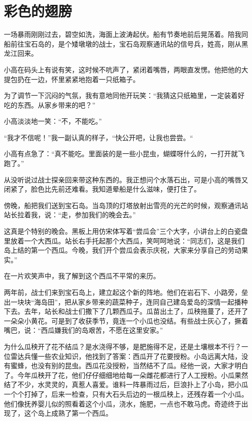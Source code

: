 \documentclass[12pt,UTF-8,openany]{ctexbook}
\begin{document}
\chapter{彩色的翅膀}

\begin{Large}
    
    一场暴雨刚刚过去，碧空如洗，海面上波涛起伏。船有节奏地前后晃荡着。陪我同船前往宝石岛的，是个矮墩墩的战士，宝石岛观察通讯站的信号兵，姓高，刚从黑龙江回来。
    
    小高在码头上有说有笑，这时候不吭声了，紧闭着嘴唇，两眼直发愣。他把他的大提包扔在一边，怀里紧紧地抱着一只纸箱子。
    
    为了调节一下沉闷的气氛，我有意地同他开玩笑：“我猜这只纸箱里，一定装着好吃的东西。从家乡带来的吧？”
    
    小高淡淡地一笑：“不，不能吃。”
    
    “我才不信呢！”我一副认真的样子，“快公开吧，让我也尝尝。“
    
    小高有点急了：“真不能吃。里面装的是一些小昆虫，蝴蝶呀什么的，一打开就飞跑了。”
    
    从没听说过战士探亲回来带这种东西的。我正想问个水落石出，可是小高的嘴唇又闭紧了，脸色比先前还难看。我知道晕船是什么滋味，便打住了。
    
    傍晚，船把我们送到宝石岛。当岛顶的灯塔放射出雪亮的光芒的时候，观察通讯站站长拉着我，说：“走，参加我们的晚会去。”
    
    这真是个特别的晚会。黑板上用仿宋体写着“尝瓜会”三个大字，小讲台上的白瓷盘里放着一个大西瓜。站长右手托起那个大西瓜，笑呵呵地说：“同志们，这是我们岛上结的第一个西瓜。今晚，我们开个尝瓜会表示庆祝，大家来分享自己的劳动果实。”
    
    在一片欢笑声中，我了解到这个西瓜不平常的来历。
    
    两年前，战士们来到宝石岛上，建立起这个新的阵地。他们在岩石下、小路旁，垒出一块块“海岛田”，把从家乡带来的蔬菜种子，连同自己建岛爱岛的深情一起播种下去。去年，站长和战士们撒下了几颗西瓜子。瓜苗出土了，瓜秧拖蔓了，还开了一朵朵小黄花。可是到了收获季节，竟连一个小瓜也没结。有些战士灰心了，撅着嘴巴，说：“西瓜嫌我们的岛艰苦，不愿在这里安家。”
    
    为什么瓜秧开了花不结瓜？是水浇得不够，是肥施得不足，还是土壤根本不行？一位雷达兵懂一些农业知识，他找到了答案：西瓜开了花要授粉。小岛远离大陆，没有蜜蜂，也没有别的昆虫。西瓜花没授粉，当然结不了瓜。经他一说，大家才明白了。今年瓜秧开了花，他们仔仔细细地给每一朵雌花都进行了人工授粉。小瓜果然结了不少，水灵灵的，真惹人喜爱。谁料一阵暴雨过后，巨浪扑上了小岛，把小瓜一个个打掉了，后来一检查，只有大石头后边的一根瓜秧上，还残存着一个小瓜。他们像抚养婴儿似的照看着这个小瓜，浇水，施肥，一点也不敢马虎。奇迹终于出现了，这个岛上成熟了第一个西瓜。
    

\end{Large}
\end{document}
